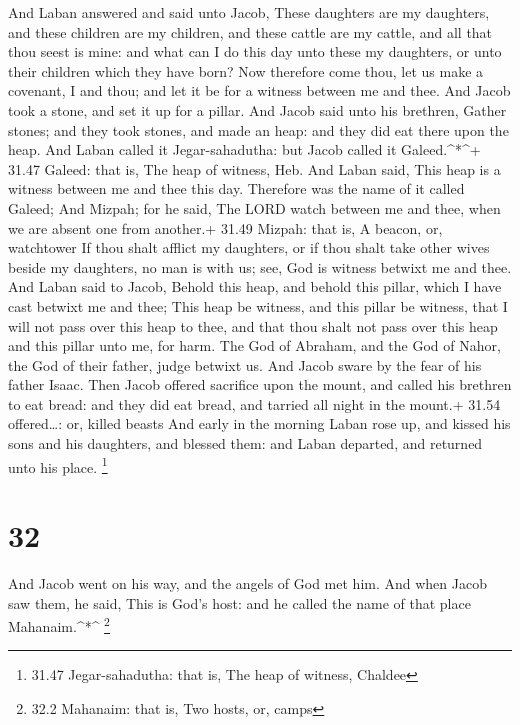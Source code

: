  And Laban answered and said unto Jacob, These daughters
are my daughters, and these children are my children, and these cattle
are my cattle, and all that thou seest is mine: and what can I do this
day unto these my daughters, or unto their children which they have
born?  Now therefore come thou, let us make a covenant, I
and thou; and let it be for a witness between me and thee. 
And Jacob took a stone, and set it up for a pillar.  And
Jacob said unto his brethren, Gather stones; and they took stones, and
made an heap: and they did eat there upon the heap.  And
Laban called it Jegar-sahadutha: but Jacob called it Galeed.\^{}*\^{}+
31.47 Galeed: that is, The heap of witness, Heb.  And Laban
said, This heap is a witness between me and thee this day. Therefore was
the name of it called Galeed;  And Mizpah; for he said, The
LORD watch between me and thee, when we are absent one from another.+
31.49 Mizpah: that is, A beacon, or, watchtower  If thou
shalt afflict my daughters, or if thou shalt take other wives beside my
daughters, no man is with us; see, God is witness betwixt me and thee.
 And Laban said to Jacob, Behold this heap, and behold this
pillar, which I have cast betwixt me and thee;  This heap
be witness, and this pillar be witness, that I will not pass over this
heap to thee, and that thou shalt not pass over this heap and this
pillar unto me, for harm.  The God of Abraham, and the God
of Nahor, the God of their father, judge betwixt us. And Jacob sware by
the fear of his father Isaac.  Then Jacob offered sacrifice
upon the mount, and called his brethren to eat bread: and they did eat
bread, and tarried all night in the mount.+ 31.54 offered\ldots: or,
killed beasts  And early in the morning Laban rose up, and
kissed his sons and his daughters, and blessed them: and Laban departed,
and returned unto his place. \footnote{31.47 Jegar-sahadutha: that is,
  The heap of witness, Chaldee}

\hypertarget{section-31}{%
\section{32}\label{section-31}}

 And Jacob went on his way, and the angels of God met him.
 And when Jacob saw them, he said, This is God's host: and
he called the name of that place Mahanaim.\^{}*\^{} \footnote{32.2
  Mahanaim: that is, Two hosts, or, camps}

